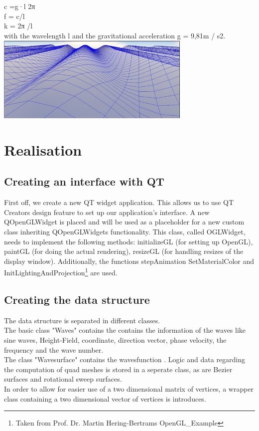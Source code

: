 \documentclass[12pt,a4paper]{scrartcl}
\begin{document}
c =g·l 2π \\
f = c/l\\
k = 2π /l\\

with the wavelength l and the gravitational acceleration g = 9,81m / s2. \\

\includegraphics[width=0.7\textwidth]{Images/SinWaves.jpg}

\label{fig:Bild1}


\section{Realisation}

\subsection{Creating an interface with QT}
First off, we create a new QT widget application. This allows us to use QT Creators design feature to set up our application's interface. A new QOpenGLWidget is placed and will be used as a placeholder for a new custom class inheriting QOpenGLWidgets functionality. This class, called OGLWidget, needs to implement the following methods: initializeGL (for setting up OpenGL), paintGL (for doing the actual rendering), resizeGL (for handling resizes of the display window). Additionally, the functions stepAnimation SetMaterialColor and InitLightingAndProjection\footnote{Taken from Prof. Dr. Martin Hering-Bertrams OpenGL_Example} are used.

\subsection{Creating the data structure}
The data structure is separated in different classes. \\
The basic class "Waves" contains the contains the information of the waves like sine waves, Height-Field, coordinate, direction vector, phase velocity, the frequency and the wave number.  \\ 
The class "Wavesurface" contains the wavesfunction . 
Logic and data regarding the computation of quad meshes is stored in a seperate class, as are Bezier surfaces and rotational sweep surfaces. \\
In order to allow for easier use of a two dimensional matrix of vertices, a wrapper class containing a two dimensional vector of vertices is introduces. \\
\end{document}
